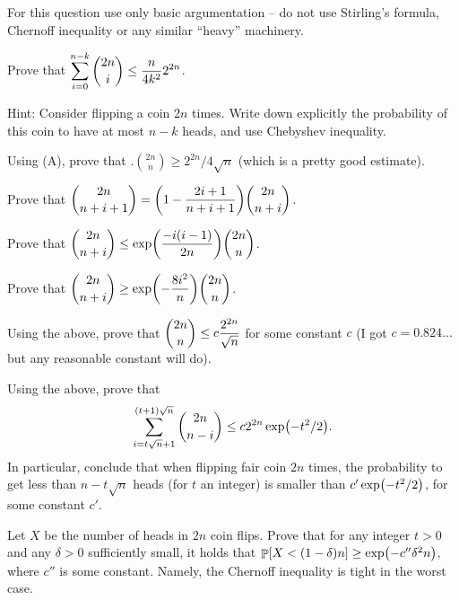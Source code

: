 {%
   For this question use only basic argumentation -- do not use
   Stirling's formula, Chernoff inequality or any similar ``heavy''
   machinery.
   \begin{compactenumA}
        \item Prove that $\displaystyle \sum_{i=0}^{n - k} \binom{2n}{i} \leq
        \frac{n}{4k^2} 2^{2n}$.

        Hint: Consider flipping a coin $2n$ times. Write down
        explicitly the probability of this coin to have at most $n-k$
        heads, and use Chebyshev inequality.

        \item Using (A), prove that $\Bigg. \binom{2n}{n} \geq
        2^{2n}/4 \sqrt{n}$ (which is a pretty good estimate).

        \item Prove that $\ds \binom{2n}{n + i + 1} = \pth{ 1-
           \frac{2i+1}{n+i+1}} \binom{2n}{n+i}$.

        \item Prove that $\ds \binom{2n}{n + i}\leq \exp\pth{ \frac{-
              i(i-1)}{2n}} \binom{2n}{n}$.

        \item Prove that $\ds \binom{2n}{n + i} \geq \exp\pth{ -\frac{
              8 i^2}{n}} \binom{2n}{n}$.

        \item Using the above, prove that $\displaystyle \binom{2n}{n} \leq c
        \frac{2^{2n}}{\sqrt{n}}$ for some constant $c$ (I got $c
        =0.824...$ but any reasonable constant will do).

        \item Using the above, prove that
        \[
        \sum_{i=t\sqrt{n} + 1}^{(t+1)\sqrt{n}} \binom{2n}{n - i} \leq
        c 2^{2n} \exp \pth{-t^2/ 2}.
        \]
        In particular, conclude that when flipping fair coin $2n$
        times, the probability to get less than $n - t\sqrt{n}$ heads
        (for $t$ an integer) is smaller than $c' \exp \pth{-t^2/2}$,
        for some constant $c'$.

        \medskip

        \item Let $X$ be the number of heads in $2n$ coin flips.
        Prove that for any integer $t > 0$ and any $\delta >0$
        sufficiently small, it holds that
        $\Prob{ X < (1- \delta) n} \geq \exp \pth{-c''\delta^2 n }$,
        where $c''$ is some constant. Namely, the Chernoff inequality
        is tight in the worst case.
    \end{compactenumA}
 }{}



